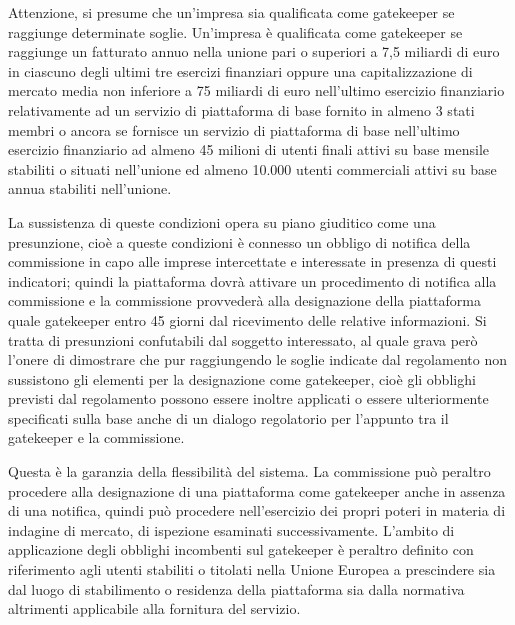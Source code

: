 Attenzione, si presume che un'impresa sia qualificata come gatekeeper se raggiunge determinate soglie.
Un'impresa è qualificata come gatekeeper se raggiunge un fatturato annuo nella unione pari o superiori a 7,5 miliardi di euro in ciascuno degli ultimi tre esercizi finanziari oppure una capitalizzazione di mercato media non inferiore a 75 miliardi di euro nell'ultimo esercizio finanziario relativamente ad un servizio di piattaforma di base fornito in almeno 3 stati membri o ancora se fornisce un servizio di piattaforma di base nell'ultimo esercizio finanziario ad almeno 45 milioni di utenti finali attivi su base mensile stabiliti o situati nell'unione ed almeno 10.000 utenti commerciali attivi su base annua stabiliti nell'unione.

La sussistenza di queste condizioni opera su piano giuditico come una presunzione, cioè a queste condizioni è connesso un obbligo di notifica della commissione in capo alle imprese intercettate e interessate in presenza di questi indicatori; quindi la piattaforma dovrà attivare un procedimento di notifica alla commissione e la commissione provvederà alla designazione della piattaforma quale gatekeeper entro 45 giorni dal ricevimento delle relative informazioni.
Si tratta di presunzioni confutabili dal soggetto interessato, al quale grava però l'onere di dimostrare che pur raggiungendo le soglie indicate dal regolamento non sussistono gli elementi per la designazione come gatekeeper, cioè gli obblighi previsti dal regolamento possono essere inoltre applicati o essere ulteriormente specificati sulla base anche di un dialogo regolatorio per l'appunto tra il gatekeeper e la commissione.

Questa è la garanzia della flessibilità del sistema.
La commissione può peraltro procedere alla designazione di una piattaforma come gatekeeper anche in assenza di una notifica, quindi può procedere nell'esercizio dei propri poteri in materia di indagine di mercato, di ispezione esaminati successivamente.
L'ambito di applicazione degli obblighi incombenti sul gatekeeper è peraltro definito con riferimento agli utenti stabiliti o titolati nella Unione Europea a prescindere sia dal luogo di stabilimento o residenza della piattaforma sia dalla normativa altrimenti applicabile alla fornitura del servizio.

